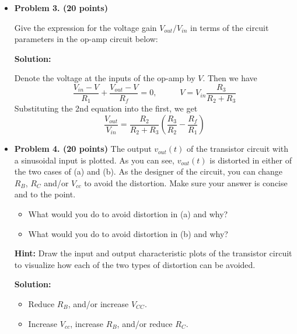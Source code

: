 \begin{enumerate}
\begin{itemize}
{\bf Solution:}
\[
V_{CC}-V_{BE}=I_B R_B+(\beta+1)I_BR_E,\;\;\;\;\;
I_B=\frac{V_{CC}-V_{BE}}{R_B+(\beta+1)R_E}
\]
\[
I_C=\beta I_B=\beta \frac{V_{CC}-V_{BE}}{R_B+(\beta+1)R_E},\;\;\;\;\;
V_{CE}\approx V_{CC}-I_C(R_C+R_E)
\]
\[
V_{CE}=I_C(R_C+R_E)=\frac{\beta(V_{CC}-R_{BE})}{R_B+\beta R_E}(R_C+R_E)
=\frac{9.3\times 200}{R_B+100}2.5=\frac{V_{CC}}{2}=5
\]
Solving to get $R_B=830K$. For the rest see
.


\item {\bf Problem 3. (20 points)} 

  Give the expression for the voltage gain $V_{out}/V_{in}$ in terms of 
  the circuit parameters in the op-amp circuit below:


  {\bf Solution:}

  Denote the voltage at the inputs of the op-amp by $V$. Then we have
  \[
  \frac{V_{in}-V}{R_1}+\frac{V_{out}-V}{R_f}=0,\;\;\;\;\;\;\;\;\;\;
  V=V_{in}\frac{R_3}{R_2+R_3}
  \]
  Substituting the 2nd equation into the first, we get
  \[
  \frac{V_{out}}{V_{in}}=\frac{R_2}{R_2+R_3}\left( \frac{R_3}{R_2}-\frac{R_f}{R_1}\right)
  \]


\item {\bf Problem 4. (20 points)} 
The output $v_{out}(t)$ of the transistor circuit with a sinusoidal 
input is plotted. As you can see, $v_{out}(t)$ is distorted in either 
of the two cases of (a) and (b). As the designer of the circuit, you 
can change $R_B$, $R_C$ and/or $V_{cc}$ to avoid the distortion. Make
sure your answer is concise and to the point.



\begin{itemize}
\item What would you do to avoid distortion in (a) and why? 
\item What would you do to avoid distortion in (b) and why? 
\end{itemize}


{\bf Hint:} Draw the input and output characteristic plots of the transistor
circuit to visualize how each of the two types of distortion can be avoided.

{\bf Solution:}

\begin{itemize}
\item Reduce $R_B$, and/or increase $V_{CC}$.
\item Increase $V_{cc}$, increase $R_B$, and/or reduce $R_C$.
\end{itemize}



\end{itemize}
\end{enumerate}
